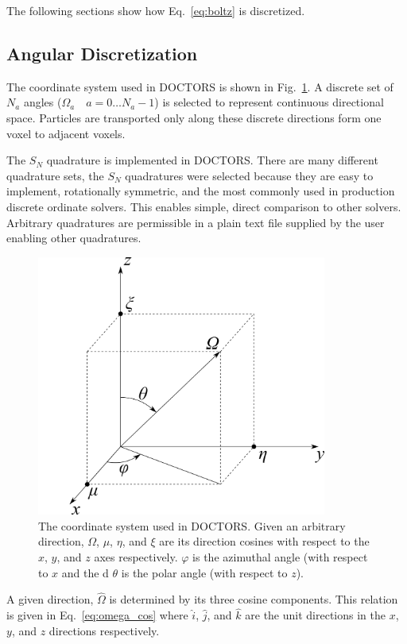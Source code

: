 The following sections show how Eq.~\ref{eq:boltz} is discretized.

\subsection{Angular Discretization}
The coordinate system used in DOCTORS is shown in Fig.~\ref{fig:coord_sys}. A discrete set of $N_a$ angles ($\Omega_{a} \quad a = 0 \ldots N_a-1$) is selected to represent continuous directional space. Particles are transported only along these discrete directions form one voxel to adjacent voxels.

The $S_N$ quadrature is implemented in DOCTORS. There are many different quadrature sets, the $S_N$ quadratures were selected because they are easy to implement, rotationally symmetric, and the most commonly used in production discrete ordinate solvers. This enables simple, direct comparison to other solvers. Arbitrary quadratures are permissible in a plain text file supplied by the user enabling other quadratures.

\begin{figure}[tb]
  \begin{center}
   \includegraphics[width=3.75in]{figs/coord_sys}
  \end{center}
  \caption{The coordinate system used in DOCTORS. Given an arbitrary direction, $\Omega$, $\mu$, $\eta$, and $\xi$ are its direction cosines with respect to the $x$, $y$, and $z$ axes respectively. $\varphi$ is the azimuthal angle (with respect to $x$ and the d $\theta$ is the polar angle (with respect to $z$).}
\label{fig:coord_sys}
\end{figure}%

A given direction, $\hat{\Omega}$ is determined by its three cosine components. This relation is given in Eq.~\ref{eq:omega_cos} where $\hat{i}$, $\hat{j}$, and $\hat{k}$ are the unit directions in the $x$, $y$, and $z$ directions respectively.

